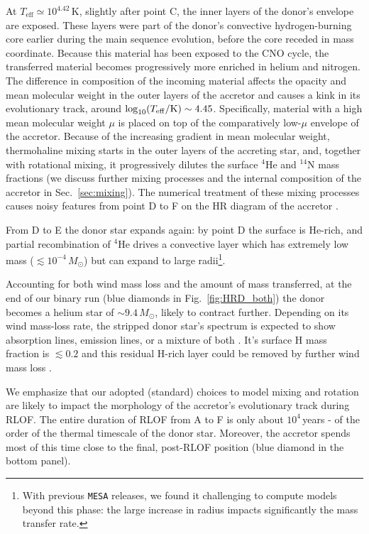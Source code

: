 \documentclass[twocolumn,twocolappendix,trackchanges]{aastex63}
\DeclareRobustCommand{\Figref}[1]{Fig.~\ref{#1}}
\DeclareRobustCommand{\Secref}[1]{Sec.~\ref{#1}}
\begin{document}
At $T_\mathrm{eff}\simeq 10^{4.42}$\,K, slightly after point C, the
inner layers of the donor's envelope are exposed. These layers were
part of the donor's convective hydrogen-burning core earlier during the main sequence evolution, before the core receded in mass
coordinate. Because this material has been exposed to the CNO cycle, the transferred material becomes progressively
more enriched in helium and nitrogen. The difference in composition of the
incoming material affects the opacity and mean molecular weight in the
outer layers of the accretor and causes a kink in its evolutionary
track, around $\log_{10} (T_{\rm eff}/\mathrm{K}) \sim 4.45$. Specifically, material with a high mean molecular weight $\mu$
is placed on top of the comparatively low-$\mu$ envelope of
the accretor. 
Because of the increasing gradient in mean molecular weight,
thermohaline mixing starts in the outer layers of the accreting star,
and, together with rotational mixing, it progressively dilutes the
surface $^4\mathrm{He}$ and $^{14}\mathrm{N}$ mass fractions (we
discuss further mixing processes and the internal composition of the
accretor in \Secref{sec:mixing}). The numerical treatment of these
mixing processes causes noisy features from point D
to F on the HR diagram of the accretor \citep[e.g.,][]{cantiello:07}.

From D to E the donor star expands again: by point D the surface is He-rich, and partial
recombination of $^4\mathrm{He}$ drives a convective layer which has extremely low mass ($\lesssim 10^{-4}\,M_\odot$) but can expand to large radii\footnote{With previous \texttt{MESA} releases, we found it
  challenging to compute models beyond this phase: the large
  increase in radius impacts significantly the mass transfer rate.}.


Accounting for both wind mass loss and the amount of mass transferred,
at the end of our binary run (blue diamonds in \Figref{fig:HRD_both})
the donor becomes a helium star of $\sim 9.4\,M_\odot$, likely to
contract further. Depending on its wind mass-loss rate, the stripped
donor star's spectrum is expected to show absorption lines, emission lines, or a
mixture of both \citep[e.g.,][]{crowther:07, massey:14, neugent:17,
  gotberg:18, shenar:20}. It's surface H mass fraction is $\lesssim 0.2$ and
this residual H-rich layer could be removed by further wind
mass loss \citep[e.g.,][]{yoon:17, gotberg:17, laplace:20}.


We emphasize that our adopted (standard) choices to model mixing and
rotation are likely to impact the morphology of the accretor's
evolutionary track during RLOF. The entire duration of RLOF from A to
F is only about $10^4$\,years - of the order of the thermal timescale
of the donor star. Moreover, the accretor spends most of this time
close to the final, post-RLOF position (blue diamond in the bottom
panel). 
\end{document}
